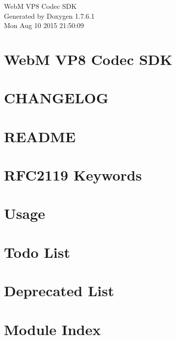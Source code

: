 \documentclass[letterpaper]{article}
\begin{document}
\hypersetup{pageanchor=false,citecolor=blue}
\begin{titlepage}
\vspace*{7cm}
\begin{center}
{\Large \-Web\-M \-V\-P8 \-Codec \-S\-D\-K }\\
\vspace*{1cm}
{\large \-Generated by Doxygen 1.7.6.1}\\
\vspace*{0.5cm}
{\small Mon Aug 10 2015 21:50:09}\\
\end{center}
\end{titlepage}
\tableofcontents
{}
\hypersetup{pageanchor=true,citecolor=blue}
\section{\-Web\-M \-V\-P8 \-Codec \-S\-D\-K}
\label{index}\hypertarget{index}{}
\section{\-C\-H\-A\-N\-G\-E\-L\-O\-G}
\label{changelog}
\hypertarget{changelog}{}

\section{\-R\-E\-A\-D\-M\-E}
\label{readme}
\hypertarget{readme}{}

\section{\-R\-F\-C2119 \-Keywords}
\label{rfc2119}
\hypertarget{rfc2119}{}

\section{\-Usage}
\label{usage}
\hypertarget{usage}{}

\section{\-Todo \-List}
\label{todo}
\hypertarget{todo}{}

\section{\-Deprecated \-List}
\label{deprecated}
\hypertarget{deprecated}{}

\section{\-Module \-Index}

\end{document}
